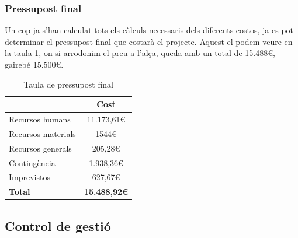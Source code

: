 \documentclass[a4paper]{article}
\begin{document}
\subsubsection{Pressupost final}

Un cop ja s'han calculat tots els càlculs necessaris dels diferents costos, ja es pot determinar el pressupost final que costarà el projecte. Aquest el podem veure en la taula \ref{tab:TaulaFinal}, on si arrodonim el preu a l'alça, queda amb un total de 15.488€, gairebé 15.500€.

\begin{table}[H]
    \begin{center}
        \begin{tabular}{|l|c|}
            \hline
            \rowcolor[HTML]{9B9B9B} 
            {\color[HTML]{000000} \textbf{}}          & {\color[HTML]{000000} \textbf{Cost}}       \\ \hline
            {\color[HTML]{000000} Recursos humans}    & {\color[HTML]{000000} 11.173,61€}          \\ \hline
            {\color[HTML]{000000} Recursos materials} & {\color[HTML]{000000} 1544€}                \\ \hline
            {\color[HTML]{000000} Recursos generals}  & {\color[HTML]{000000} 205,28€}             \\ \hline
            {\color[HTML]{000000} Contingència}       & {\color[HTML]{000000} 1.938,36€}           \\ \hline
            {\color[HTML]{000000} Imprevistos}        & {\color[HTML]{000000} 627,67€}             \\ \hline
            \rowcolor[HTML]{C0C0C0} 
            {\color[HTML]{000000} \textbf{Total}}     & {\color[HTML]{000000} \textbf{15.488,92€}} \\ \hline
        \end{tabular}
        \caption{Taula de pressupost final}
        \label{tab:TaulaFinal}
    \end{center}
\end{table}

\subsection{Control de gestió}
\end{document}
